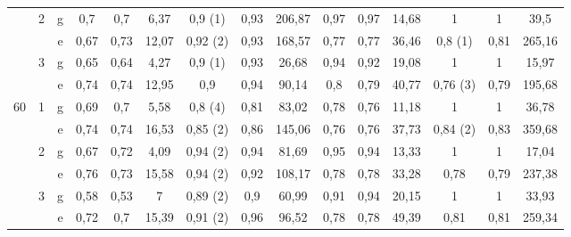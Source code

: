 \begin{table}[htbp]
{\begin{tabular}{|c|c|c|ccc|ccc|ccc|ccc|}
\cline{2-15}          & \multirow{2}[2]{*}{2} & g     & 0,7   & 0,7   & 6,37  & \textcolor[rgb]{ 1,  0,  0}{0,9 (1)} & 0,93  & 206,87 & 0,97  & 0,97  & 14,68 & 1     & 1     & 39,5 \bigstrut[t]\\
          &       & e     & 0,67  & 0,73  & 12,07 & \textcolor[rgb]{ 1,  0,  0}{0,92 (2)} & 0,93  & 168,57 & 0,77  & 0,77  & 36,46 & \textcolor[rgb]{ 1,  0,  0}{0,8 (1)} & 0,81  & 265,16 \bigstrut[b]\\
\cline{2-15}          & \multirow{2}[2]{*}{3} & g     & 0,65  & 0,64  & 4,27  & \textcolor[rgb]{ 1,  0,  0}{0,9 (1)} & 0,93  & 26,68 & 0,94  & 0,92  & 19,08 & 1     & 1     & 15,97 \bigstrut[t]\\
          &       & e     & 0,74  & 0,74  & 12,95 & 0,9   & 0,94  & 90,14 & 0,8   & 0,79  & 40,77 & \textcolor[rgb]{ 1,  0,  0}{0,76 (3)} & 0,79  & 195,68 \bigstrut[b]\\
    \hline
    \hline
    \multirow{6}[6]{*}{60} & \multirow{2}[2]{*}{1} & g     & 0,69  & 0,7   & 5,58  & \textcolor[rgb]{ 1,  0,  0}{0,8 (4)} & 0,81  & 83,02 & 0,78  & 0,76  & 11,18 & 1     & 1     & 36,78 \bigstrut[t]\\
          &       & e     & 0,74  & 0,74  & 16,53 & \textcolor[rgb]{ 1,  0,  0}{0,85 (2)} & 0,86  & 145,06 & 0,76  & 0,76  & 37,73 & \textcolor[rgb]{ 1,  0,  0}{0,84 (2)} & 0,83  & 359,68 \bigstrut[b]\\
\cline{2-15}          & \multirow{2}[2]{*}{2} & g     & 0,67  & 0,72  & 4,09  & \textcolor[rgb]{ 1,  0,  0}{0,94 (2)} & 0,94  & 81,69 & 0,95  & 0,94  & 13,33 & 1     & 1     & 17,04 \bigstrut[t]\\
          &       & e     & 0,76  & 0,73  & 15,58 & \textcolor[rgb]{ 1,  0,  0}{0,94 (2)} & 0,92  & 108,17 & 0,78  & 0,78  & 33,28 & 0,78  & 0,79  & 237,38 \bigstrut[b]\\
\cline{2-15}          & \multirow{2}[2]{*}{3} & g     & 0,58  & 0,53  & 7     & \textcolor[rgb]{ 1,  0,  0}{0,89 (2)} & 0,9   & 60,99 & 0,91  & 0,94  & 20,15 & 1     & 1     & 33,93 \bigstrut[t]\\
          &       & e     & 0,72  & 0,7   & 15,39 & \textcolor[rgb]{ 1,  0,  0}{0,91 (2)} & 0,96  & 96,52 & 0,78  & 0,78  & 49,39 & 0,81  & 0,81  & 259,34 \bigstrut[b]\\
    \hline
    \end{tabular}}%
  \label{tab:addlabel}%
\end{table}%




